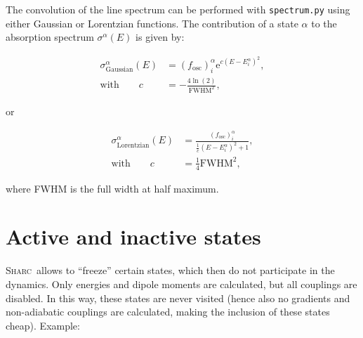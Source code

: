 \documentclass[a4paper,11pt,DIV=15,openany,twoside=false]{scrbook}
\newcommand{\tthdump}[1]{#1}
\newcommand{\sharc}{\textsc{Sharc}}
\newcommand{\ttt}[1]{\texttt{#1}}
\newcommand{\E}{\ensuremath{\mathrm{e}}}
\begin{document}
The convolution of the line spectrum can be performed with \ttt{spectrum.py} using either Gaussian or Lorentzian functions. The contribution of a state $\alpha$ to the absorption spectrum $\sigma^\alpha(E)$ is given by:
\tthdump{
  \begin{align}
    \sigma_{\text{Gaussian}}^\alpha(E)&=
    \left(f_{\text{osc}}\right)_i^\alpha 
    \E^{c\left(E-E_i^\alpha\right)^2},\\
    \text{with}\qquad
    c&=-\frac{4\ln(2)}{\text{FWHM}^2},
  \end{align}
}
or
\tthdump{
  \begin{align}
    \sigma_{\text{Lorentzian}}^\alpha(E)&=
    \frac{\left(f_{\text{osc}}\right)_i^\alpha}{\frac{1}{c}\left(E-E_i^\alpha\right)^2+1},\\
    \text{with}\qquad
    c&=\frac{1}{4}\text{FWHM}^2,
  \end{align}
}
where FWHM is the full width at half maximum.


\section{Active and inactive states}\label{met:activestates}

\sharc\ allows to ``freeze'' certain states, which then do not participate in the dynamics. Only energies and dipole moments are calculated, but all couplings are disabled. In this way, these states are never visited (hence also no gradients and non-adiabatic couplings are calculated, making the inclusion of these states cheap). Example:
\end{document}
